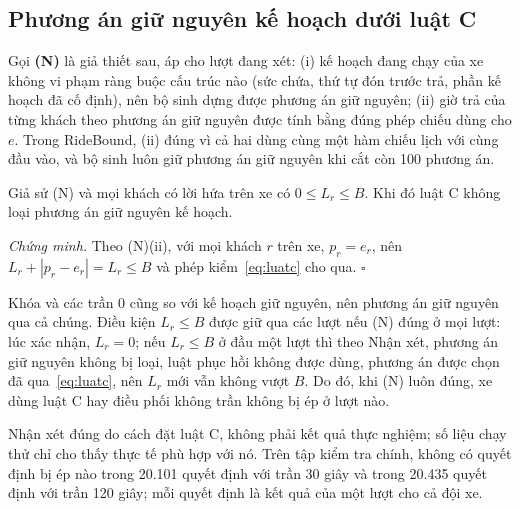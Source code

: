 \subsection{Phương án giữ nguyên kế hoạch dưới luật C}
\label{muc:giunguyen}

Gọi \textbf{(N)} là giả thiết sau, áp cho lượt đang xét: (i) kế hoạch đang chạy của xe không vi phạm ràng buộc
cấu trúc nào (sức chứa, thứ tự đón trước trả, phần kế hoạch đã cố định), nên bộ sinh dựng được phương án giữ
nguyên; (ii) giờ trả của từng khách theo phương án giữ nguyên được tính bằng đúng phép chiếu dùng cho $e$.
Trong RideBound, (ii) đúng vì cả hai dùng cùng một hàm chiếu lịch với cùng đầu vào, và bộ sinh luôn giữ phương
án giữ nguyên khi cắt còn 100 phương án.

\begin{nhanxet}
\label{nx:giunguyen}
Giả sử (N) và mọi khách có lời hứa trên xe có $0 \le L_r \le B$. Khi đó luật C không loại phương án giữ nguyên
kế hoạch.
\end{nhanxet}

\noindent\textit{Chứng minh.} Theo (N)(ii), với mọi khách $r$ trên xe, $p_r = e_r$, nên
$L_r + |p_r - e_r| = L_r \le B$ và phép kiểm~\eqref{eq:luatc} cho qua. \hfill$\square$

Khóa và các trần 0 cũng so với kế hoạch giữ nguyên, nên phương án giữ nguyên qua cả chúng. Điều kiện
$L_r \le B$ được giữ qua các lượt nếu (N) đúng ở mọi lượt: lúc xác nhận, $L_r = 0$; nếu $L_r \le B$ ở đầu một
lượt thì theo Nhận xét, phương án giữ nguyên không bị loại, luật phục hồi không được dùng, phương án được chọn
đã qua~\eqref{eq:luatc}, nên $L_r$ mới vẫn không vượt $B$. Do đó, khi (N) luôn đúng, xe dùng luật C hay điều
phối không trần không bị ép ở lượt nào.

Nhận xét đúng do cách đặt luật C, không phải kết quả thực nghiệm; số liệu chạy thử chỉ cho thấy thực tế phù hợp
với nó. Trên tập kiểm tra chính, không có quyết định bị ép nào trong 20.101 quyết định với trần 30 giây và trong
20.435 quyết định với trần 120 giây; mỗi quyết định là kết quả của một lượt cho cả đội xe.

